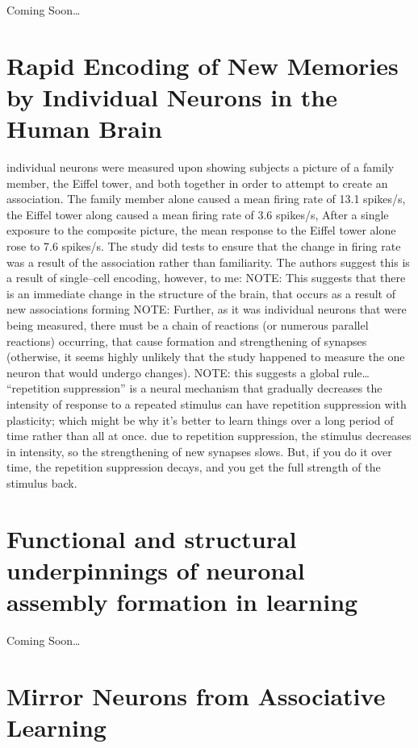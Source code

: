 \documentclass[11pt, a4paper, oneside]{article}   	%
\begin{document}
Coming Soon\ldots


\section{Rapid Encoding of New Memories by Individual Neurons in the Human Brain \cite{Ison2015}}

\begin{outline}
    \point individual neurons were measured upon showing subjects a picture of a family member, the Eiffel tower, and both together in order to attempt to create an association. The family member alone caused a mean firing rate of 13.1 spikes/s, the Eiffel tower along caused a mean firing rate of 3.6 spikes/s, After a single exposure to the composite picture, the mean response to the Eiffel tower alone rose to 7.6 spikes/s. The study did tests to ensure that the change in firing rate was a result of the association rather than familiarity.  
    \point The authors suggest this is a result of single--cell encoding, however, to me:
        \subpoint NOTE: This suggests that there is an immediate change in the structure of the brain, that occurs as a result of new associations forming
        \subpoint NOTE: Further, as it was individual neurons that were being measured, there must be a chain of reactions (or numerous parallel reactions) occurring, that cause formation and strengthening of synapses (otherwise, it seems highly unlikely that the study happened to measure the one neuron that would undergo changes).
            \subsubpoint NOTE: this suggests a global rule\ldots
\point ``repetition suppression'' is a neural mechanism that gradually decreases the intensity of response to a repeated stimulus
    \subpoint can have repetition suppression with plasticity; which might be why it's better to learn things over a long period of time rather than all at once. due to repetition suppression, the stimulus decreases in intensity, so the strengthening of new synapses slows. But, if you do it over time, the repetition suppression decays, and you get the full strength of the stimulus back.
\end{outline}


\section{Functional and structural underpinnings of neuronal assembly formation in learning \cite{Holtmaat2016}}

Coming Soon\ldots


\section{Mirror Neurons from Associative Learning \cite{Catmur2016}}
\end{document}

